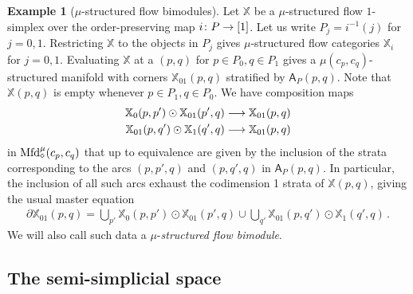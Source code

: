 \documentclass[10pt]{amsart}
\numberwithin{equation}{section}
\theoremstyle{definition}
\newtheorem{ex}[prop]{Example}
\newcommand{\Mfd}{\mathrm{Mfd}\vphantom{d}}
\newcommand{\bX}{\mathbb{X}}
\newcommand{\sfA}{\mathsf{A}}
\newcommand{\del}{\partial}
\renewcommand{\to}{\mathchoice{\longrightarrow}{\rightarrow}{}{}}
\begin{document}
\begin{ex}[$\mu$-structured flow bimodules]
	Let $\bX$ be a $\mu$-structured flow $1$-simplex over the order-preserving map $i\colon P\to [1]$.
	Let us write $P_j = i^{-1}(j)$ for $j=0,1$.
	Restricting $\bX$ to the objects in $P_{j}$ gives $\mu$-structured flow categories $\bX_{i}$ for $j=0,1$.
	Evaluating $\bX$ at a $(p,q)$ for $p\in P_0, q\in P_{1}$ gives a $\mu(c_{p},c_{q})$-structured manifold with corners $\bX_{01}(p,q)$ stratified by $\sfA_{P}(p,q)$. Note that $\bX(p,q)$ is empty whenever $p\in P_{1}, q\in P_{0}$. We have composition maps
	\begin{align*}
		\bX_{0}(p,p') \odot \bX_{01}(p',q) &\to \bX_{01}(p,q) \\
		\bX_{01}(p,q') \odot \bX_{1}(q',q) &\to \bX_{01}(p,q)
	\end{align*}
	in $\Mfd_{\diamond}^{\mu}(c_{p},c_{q})$ that up to equivalence are given by the inclusion of the strata corresponding to the arcs $(p,p',q)$ and $(p,q',q)$ in $\sfA_{P}(p,q)$.
	In particular, the inclusion of all such arcs exhaust the codimension 1 strata of $\bX(p,q)$, giving the usual master equation
	\begin{align*}
		\del \bX_{01}(p,q) = \bigcup_{p'} \bX_{0}(p,p') \odot \bX_{01}(p',q) \cup \bigcup_{q'} \bX_{01}(p,q')\odot \bX_{1}(q',q) \,.
	\end{align*}
	We will also call such data a $\mu$-\emph{structured flow bimodule}.
\end{ex}

\subsection{The semi-simplicial space}\label{subsec:the_semi-simplicial_space}
\end{document}
